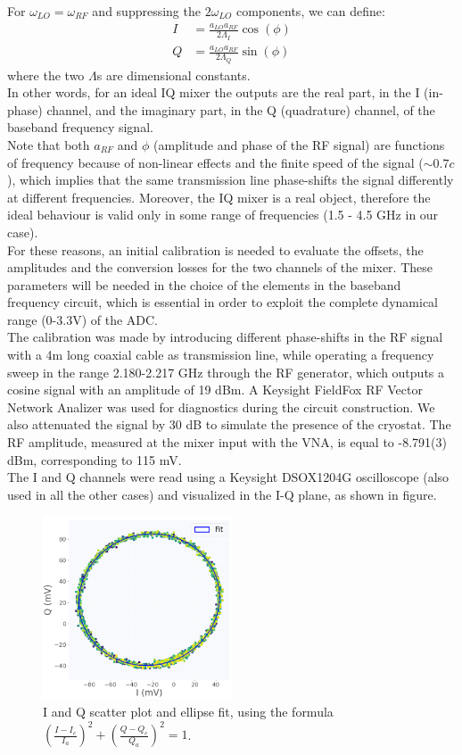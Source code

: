\documentclass[12pt]{article}
\begin{document}
For $\omega_{LO} = \omega_{RF}$ and suppressing the $2\omega_{LO}$ components, we can define:
\begin{align}
I &= \frac{a_{LO}a_{RF}}{2 \Lambda_I}\cos(\phi) \\
Q &= \frac{a_{LO}a_{RF}}{ 2 \Lambda_Q}\sin(\phi)
\end{align}
where the two $\Lambda$s are dimensional constants.\\
In other words, for an ideal IQ mixer the outputs are the real part, in the I (in-phase) channel, and the imaginary part, in the Q (quadrature) channel, of the baseband frequency signal.\\
Note that both $a_{RF}$ and $\phi$ (amplitude and phase of the RF signal) are functions of frequency because of non-linear effects and the finite speed of the signal ($\sim 0.7c$), which implies that the same transmission line phase-shifts the signal differently at different frequencies. Moreover, the IQ mixer is a real object, therefore the ideal behaviour is valid only in some range of frequencies (1.5 - 4.5 GHz in our case).\\
For these reasons, an initial calibration is needed to evaluate the offsets, the amplitudes and the conversion losses for the two channels of the mixer. These parameters will be needed in the choice of the elements in the baseband frequency circuit, which is essential in order to exploit the complete dynamical range (0-3.3V) of the ADC.\\
The calibration was made by introducing different phase-shifts in the RF signal with a 4m long coaxial cable as transmission line, while operating a frequency sweep in the range 2.180-2.217 GHz through the RF generator, which outputs a cosine signal with an amplitude of 19 dBm. A Keysight FieldFox RF Vector Network Analizer was used for diagnostics during the circuit construction.
We also attenuated the signal by 30 dB to simulate the presence of the cryostat. The RF amplitude, measured at the mixer input with the VNA, is equal to -8.791(3) dBm, corresponding to 115 mV.\\
The I and Q channels were read using a Keysight DSOX1204G oscilloscope (also used in all the other cases) and visualized in the I-Q plane, as shown in figure.
\begin{figure}[H]
        \centering
        \includegraphics[width=0.5\textwidth]{oscilloscope_circle_before_if_circuit.png}
        \caption{I and Q scatter plot and ellipse fit, using the formula $ \left(\frac{I - I_c}{I_a} \right)^2 + \left(\frac{Q - Q_c}{Q_a} \right)^2 = 1 $.}
        \label{IQfit}
    \end{figure}
\end{document}
